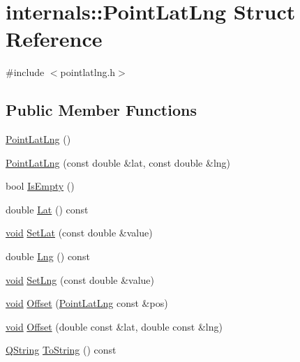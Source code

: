 \hypertarget{structinternals_1_1_point_lat_lng}{\section{internals\-:\-:\-Point\-Lat\-Lng \-Struct \-Reference}
\label{structinternals_1_1_point_lat_lng}
}


{\ttfamily \#include $<$pointlatlng.\-h$>$}

\subsection*{\-Public \-Member \-Functions}
\begin{DoxyCompactItemize}
\item 
\hyperlink{group___o_p_map_widget_ga1e0b690c0014f60cf7b9444345110709}{\-Point\-Lat\-Lng} ()
\item 
\hyperlink{group___o_p_map_widget_ga9d9ccecdc15490db949e762a8d5bfd25}{\-Point\-Lat\-Lng} (const double \&lat, const double \&lng)
\item 
bool \hyperlink{group___o_p_map_widget_gadcc729a47d0615eb914a429e90acc041}{\-Is\-Empty} ()
\item 
double \hyperlink{group___o_p_map_widget_gacf58e663626e5a88876d68937505dc64}{\-Lat} () const 
\item 
\hyperlink{group___u_a_v_objects_plugin_ga444cf2ff3f0ecbe028adce838d373f5c}{void} \hyperlink{group___o_p_map_widget_ga800a9e0154cc69ea20a677726a3a82c9}{\-Set\-Lat} (const double \&value)
\item 
double \hyperlink{group___o_p_map_widget_ga2a02db7101a66a3c2e5f536e60b38423}{\-Lng} () const 
\item 
\hyperlink{group___u_a_v_objects_plugin_ga444cf2ff3f0ecbe028adce838d373f5c}{void} \hyperlink{group___o_p_map_widget_gaa211add3899eb9c7ca5f82fad953461c}{\-Set\-Lng} (const double \&value)
\item 
\hyperlink{group___u_a_v_objects_plugin_ga444cf2ff3f0ecbe028adce838d373f5c}{void} \hyperlink{group___o_p_map_widget_ga3ad4201693b6e3add6b7ad1b9ff2e473}{\-Offset} (\hyperlink{structinternals_1_1_point_lat_lng}{\-Point\-Lat\-Lng} const \&pos)
\item 
\hyperlink{group___u_a_v_objects_plugin_ga444cf2ff3f0ecbe028adce838d373f5c}{void} \hyperlink{group___o_p_map_widget_ga41a2477cd6dbc4af991b30ddc2fc03c2}{\-Offset} (double const \&lat, double const \&lng)
\item 
\hyperlink{group___u_a_v_objects_plugin_gab9d252f49c333c94a72f97ce3105a32d}{\-Q\-String} \hyperlink{group___o_p_map_widget_gad6aaf34436258a8288cae1d93e13ad07}{\-To\-String} () const 
\end{DoxyCompactItemize}
